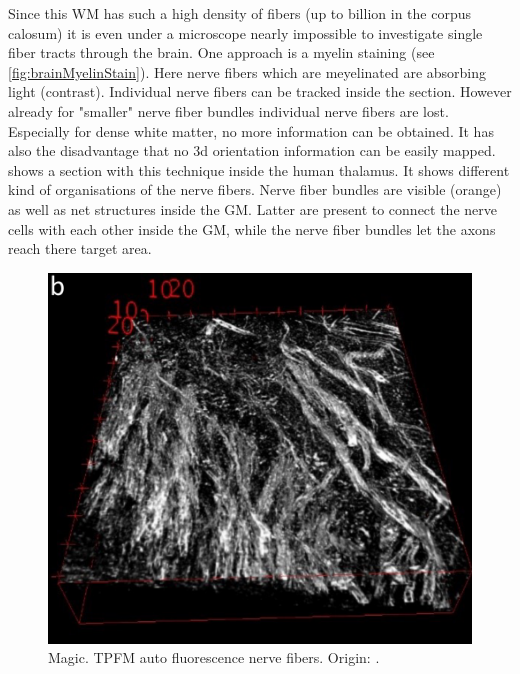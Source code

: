 % 
Since this \ac{WM} has such a high density of fibers (up to billion in the corpus calosum) it is even under a microscope nearly impossible to investigate single fiber tracts through the brain.
One approach is a myelin staining (see \cref{fig:brainMyelinStain}).
Here nerve fibers which are meyelinated are absorbing light (contrast).
Individual nerve fibers can be tracked inside the section.
However already for "smaller" nerve fiber bundles individual nerve fibers are lost.
Especially for dense white matter, no more information can be obtained.
It has also the disadvantage that no 3d orientation information can be easily mapped.
 shows a section with this technique inside the human thalamus.
It shows different kind of organisations of the nerve fibers.
Nerve fiber bundles are visible (orange) as well as net structures inside the \ac{GM}.
Latter are present to connect the nerve cells with each other inside the \ac{GM}, while the nerve fiber bundles let the axons reach there target area.
\par
% 
\begin{figure}[!t]
	\centering
	\includegraphics{gfx/neuroanatomy/magic.png}
	\caption{Magic. TPFM auto fluorescence nerve fibers. Origin: \cite{Costantini2020}.}
	\label{fig:brainTPFM}
\end{figure}
% 
